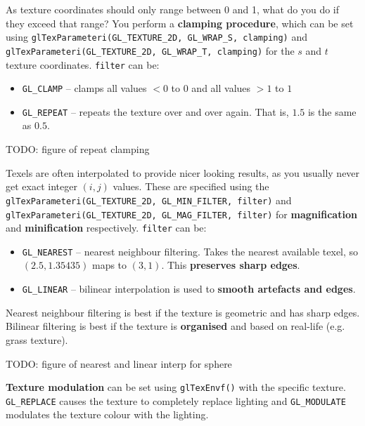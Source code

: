 \documentclass{article}
\begin{document}
As texture coordinates should only range between 0 and 1, what do you do if they exceed that range? You perform a \textbf{clamping procedure}, which can be set using \texttt{glTexParameteri(GL\_TEXTURE\_2D, GL\_WRAP\_S, clamping)} and \texttt{glTexParameteri(GL\_TEXTURE\_2D, GL\_WRAP\_T, clamping)} for the $s$ and $t$ texture coordinates. \texttt{filter} can be:
\begin{itemize}
	\item \texttt{GL\_CLAMP} -- clamps all values $< 0$ to $0$ and all values $> 1$ to $1$
	\item \texttt{GL\_REPEAT} -- repeats the texture over and over again. That is, $1.5$ is the same as $0.5$.
\end{itemize}

TODO: figure of repeat clamping

Texels are often interpolated to provide nicer looking results, as you usually never get exact integer $(i, j)$ values. These are specified using the \texttt{glTexParameteri(GL\_TEXTURE\_2D, GL\_MIN\_FILTER, filter)} and \texttt{glTexParameteri(GL\_TEXTURE\_2D, GL\_MAG\_FILTER, filter)} for \textbf{magnification} and \textbf{minification} respectively. \texttt{filter} can be:
\begin{itemize}
	\item \texttt{GL\_NEAREST} -- nearest neighbour filtering. Takes the nearest available texel, so $(2.5, 1.35435)$ maps to $(3, 1)$. This \textbf{preserves sharp edges}.
	\item \texttt{GL\_LINEAR} -- bilinear interpolation is used to \textbf{smooth artefacts and edges}.
\end{itemize}
Nearest neighbour filtering is best if the texture is geometric and has sharp edges. Bilinear filtering is best if the texture is \textbf{organised} and based on real-life (e.g. grass texture).

TODO: figure of nearest and linear interp for sphere

\textbf{Texture modulation} can be set using \texttt{glTexEnvf()} with the specific texture.   \texttt{GL\_REPLACE} causes the texture to completely replace lighting and \texttt{GL\_MODULATE} modulates the texture colour with the lighting.
\end{document}
